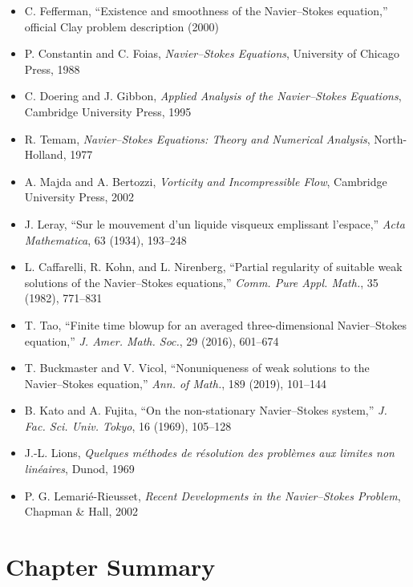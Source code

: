 \begin{itemize}
\item C. Fefferman, ``Existence and smoothness of the Navier--Stokes equation,'' official Clay problem description (2000)
\item P. Constantin and C. Foias, \textit{Navier--Stokes Equations}, University of Chicago Press, 1988
\item C. Doering and J. Gibbon, \textit{Applied Analysis of the Navier--Stokes Equations}, Cambridge University Press, 1995
\item R. Temam, \textit{Navier--Stokes Equations: Theory and Numerical Analysis}, North-Holland, 1977
\item A. Majda and A. Bertozzi, \textit{Vorticity and Incompressible Flow}, Cambridge University Press, 2002
\item J. Leray, ``Sur le mouvement d'un liquide visqueux emplissant l'espace,'' \textit{Acta Mathematica}, 63 (1934), 193--248
\item L. Caffarelli, R. Kohn, and L. Nirenberg, ``Partial regularity of suitable weak solutions of the Navier--Stokes equations,'' \textit{Comm. Pure Appl. Math.}, 35 (1982), 771--831
\item T. Tao, ``Finite time blowup for an averaged three-dimensional Navier--Stokes equation,'' \textit{J. Amer. Math. Soc.}, 29 (2016), 601--674
\item T. Buckmaster and V. Vicol, ``Nonuniqueness of weak solutions to the Navier--Stokes equation,'' \textit{Ann. of Math.}, 189 (2019), 101--144
\item B. Kato and A. Fujita, ``On the non-stationary Navier--Stokes system,'' \textit{J. Fac. Sci. Univ. Tokyo}, 16 (1969), 105--128
\item J.-L. Lions, \textit{Quelques m\'{e}thodes de r\'{e}solution des probl\`{e}mes aux limites non lin\'{e}aires}, Dunod, 1969
\item P. G. Lemari\'{e}-Rieusset, \textit{Recent Developments in the Navier--Stokes Problem}, Chapman \& Hall, 2002
\end{itemize}

\section*{Chapter Summary}

